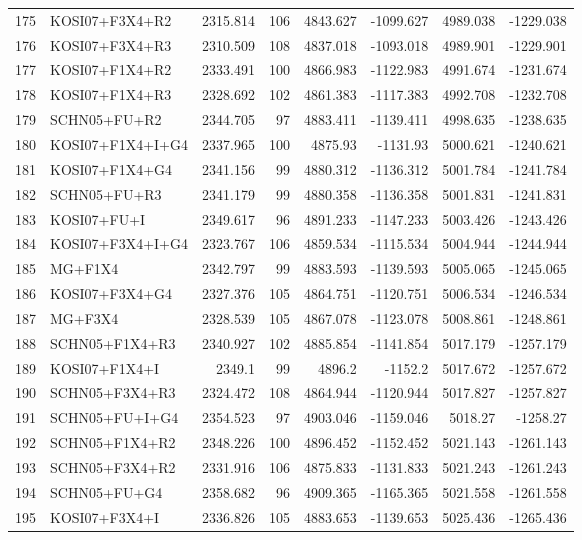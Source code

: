 \documentclass[12pt]{article}
\begin{document}
\begin{longtable}{clrrrrrr}
	175 & KOSI07+F3X4+R2 & 2315.814 & 106 & 4843.627 & -1099.627 & 4989.038 & -1229.038 \\ 
	176 & KOSI07+F3X4+R3 & 2310.509 & 108 & 4837.018 & -1093.018 & 4989.901 & -1229.901 \\ 
	177 & KOSI07+F1X4+R2 & 2333.491 & 100 & 4866.983 & -1122.983 & 4991.674 & -1231.674 \\ 
	178 & KOSI07+F1X4+R3 & 2328.692 & 102 & 4861.383 & -1117.383 & 4992.708 & -1232.708 \\ 
	179 & SCHN05+FU+R2 & 2344.705 & 97 & 4883.411 & -1139.411 & 4998.635 & -1238.635 \\ 
	180 & KOSI07+F1X4+I+G4 & 2337.965 & 100 & 4875.93 & -1131.93 & 5000.621 & -1240.621 \\ 
	181 & KOSI07+F1X4+G4 & 2341.156 & 99 & 4880.312 & -1136.312 & 5001.784 & -1241.784 \\ 
	182 & SCHN05+FU+R3 & 2341.179 & 99 & 4880.358 & -1136.358 & 5001.831 & -1241.831 \\ 
	183 & KOSI07+FU+I & 2349.617 & 96 & 4891.233 & -1147.233 & 5003.426 & -1243.426 \\ 
	184 & KOSI07+F3X4+I+G4 & 2323.767 & 106 & 4859.534 & -1115.534 & 5004.944 & -1244.944 \\ 
	185 & MG+F1X4 & 2342.797 & 99 & 4883.593 & -1139.593 & 5005.065 & -1245.065 \\ 
	186 & KOSI07+F3X4+G4 & 2327.376 & 105 & 4864.751 & -1120.751 & 5006.534 & -1246.534 \\ 
	187 & MG+F3X4 & 2328.539 & 105 & 4867.078 & -1123.078 & 5008.861 & -1248.861 \\ 
	188 & SCHN05+F1X4+R3 & 2340.927 & 102 & 4885.854 & -1141.854 & 5017.179 & -1257.179 \\ 
	189 & KOSI07+F1X4+I & 2349.1 & 99 & 4896.2 & -1152.2 & 5017.672 & -1257.672 \\ 
	190 & SCHN05+F3X4+R3 & 2324.472 & 108 & 4864.944 & -1120.944 & 5017.827 & -1257.827 \\ 
	191 & SCHN05+FU+I+G4 & 2354.523 & 97 & 4903.046 & -1159.046 & 5018.27 & -1258.27 \\ 
	192 & SCHN05+F1X4+R2 & 2348.226 & 100 & 4896.452 & -1152.452 & 5021.143 & -1261.143 \\ 
	193 & SCHN05+F3X4+R2 & 2331.916 & 106 & 4875.833 & -1131.833 & 5021.243 & -1261.243 \\ 
	194 & SCHN05+FU+G4 & 2358.682 & 96 & 4909.365 & -1165.365 & 5021.558 & -1261.558 \\ 
	195 & KOSI07+F3X4+I & 2336.826 & 105 & 4883.653 & -1139.653 & 5025.436 & -1265.436 \\ 

\end{longtable}
\end{document}
